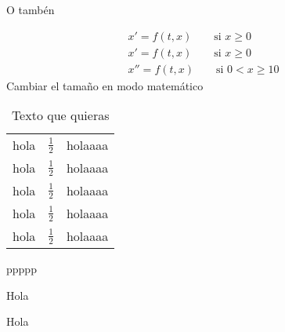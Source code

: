 O tambén 

\begin{eqnarray}
x' = f(t,x)  \qquad \mbox{si } x \geq 0  \label{eq:10} \\ 
x' = f(t,x)  \qquad \mbox{si } x \geq 0  \nonumber \\ 
x'' = f(t,x) \qquad  \mbox{si } 0 < x \geq 10   \label{eq:11}  
\end{eqnarray}
Cambiar el tamaño en modo matemático



\vspace{1cm}  

\begin{table}[h] 
\Large
\begin{center} 
\begin{tabular}{l|c|r}
\hline
\hline
hola & $\frac{1}{2}$ & holaaaa \\
hola & $\frac{1}{2}$ & holaaaa \\
hola & $\frac{1}{2}$ & holaaaa \\[5mm]
hola & $\frac{1}{2}$ & holaaaa \\
\hline
hola & $\frac{1}{2}$ & holaaaa \\
\hline
\end{tabular}
\end{center}
\caption{Texto que quieras}
\label{tab:11}
\end{table}


ppppp

\Large
Hola

\normalsize
Hola
